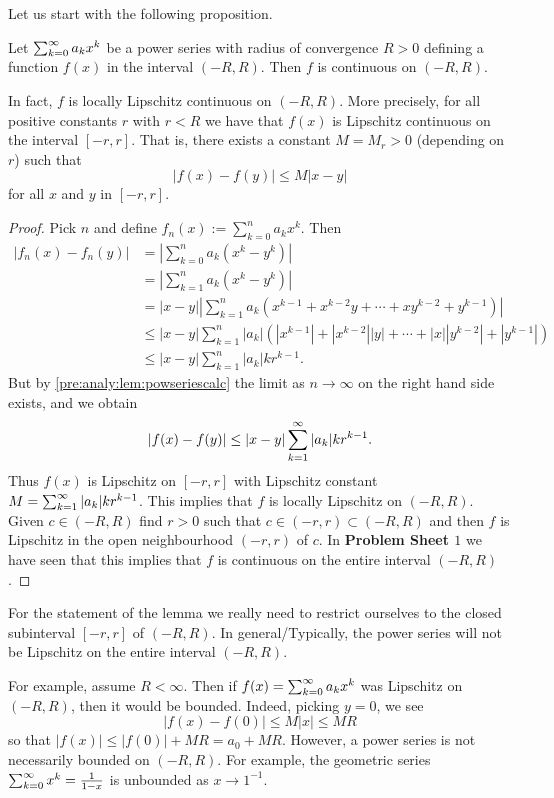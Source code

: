 \documentclass[10pt, a4paper]{article}
\begin{document}
Let us start with the following proposition.
\begin{proposition}\label{pre:analy:prop:powserarecont}
    Let $\sum_{k = 0}^{\infty} a_kx ^ k$ be a power series with radius of convergence $R > 0$ defining a function $f(x)$ in the interval $(-R, R)$.
    Then $f$ is continuous on $(-R, R)$.

    In fact,
    $f$ is locally Lipschitz continuous on $(-R, R)$.
    More precisely,
    for all positive constants $r$ with $r < R$ we have that $f(x)$ is Lipschitz continuous on the interval $[-r, r]$.
    That is,
    there exists a constant $M = M_r > 0$
    (depending on $r$)
    such that
    \[
    |f(x) - f(y)| \leq M|x - y|
    \]
    for all $x$ and $y$ in $[-r, r]$.
    \begin{proof}
        Pick $n$ and define $f_n(x) := \sum_{k = 0}^{n}a_kx ^ k$.
        Then
        \begin{align*}
            |f_n(x) - f_n(y)| &= \left|\sum_{k = 0}^{n}a_k(x ^ k - y ^ k)\right| \\
            &= \left|\sum_{k = 1}^{n}a_k(x ^ k - y ^ k)\right| \\
            &= |x - y|\left|\sum_{k = 1}^{n}a_k\left(x ^ {k - 1} + x ^ {k - 2}y + \dotsi + xy ^ {k - 2} + y ^ {k - 1}\right)\right| \\
            &\leq |x - y|\sum_{k = 1}^{n}|a_k|\left(|x ^ {k - 1}| + |x ^ {k - 2}||y| + \dotsi + |x||y ^ {k - 2}| + |y ^ {k - 1}|\right) \\
            &\leq |x - y|\sum_{k = 1}^{n}|a_k|kr ^ {k - 1}.
        \end{align*}
        But by \autoref{pre:analy:lem:powseriescalc} the limit as $n \rightarrow \infty$ on the right hand side exists,
        and we obtain
        \[
        |f(x) - f(y)| \leq |x - y|\sum_{k = 1}^{\infty}|a_k|kr ^ {k - 1}.
        \]
        Thus $f(x)$ is Lipschitz on $[-r, r]$ with Lipschitz constant $M = \sum_{k = 1}^{\infty}|a_k|kr ^ {k - 1}$.
        This implies that $f$ is locally Lipschitz on $(-R, R)$.
        Given $c \in (-R, R)$ find $r > 0$ such that $c \in (-r, r) \subset (-R, R)$ and then $f$ is Lipschitz in the open neighbourhood $(-r, r)$ of $c$.
        In \textbf{Problem Sheet $1$} we have seen that this implies that $f$ is continuous on the entire interval $(-R, R)$.
    \end{proof}
\end{proposition}

\begin{remark}
    For the statement of the lemma we really need to restrict ourselves to the closed subinterval $[-r, r]$ of $(-R, R)$.
    In general/Typically,
    the power series will not be Lipschitz on the entire interval $(-R, R)$.
    
    For example,
    assume $R < \infty$.
    Then if $f(x) = \sum_{k = 0}^{\infty} a_kx ^ k$ was Lipschitz on $(-R, R)$,
    then it would be bounded.
    Indeed,
    picking $y = 0$,
    we see
    \[
    |f(x) - f(0)| \leq M|x| \leq MR
    \]
    so that $|f(x)| \leq |f(0)| + MR = a_0 + MR$.
    However,
    a power series is not necessarily bounded on $(-R, R)$.
    For example,
    the geometric series $\sum_{k = 0}^{\infty} x ^ k = \frac{1}{1 - x}$ is unbounded as $x \rightarrow 1 ^ {-1}$.
\end{remark}
\end{document}
